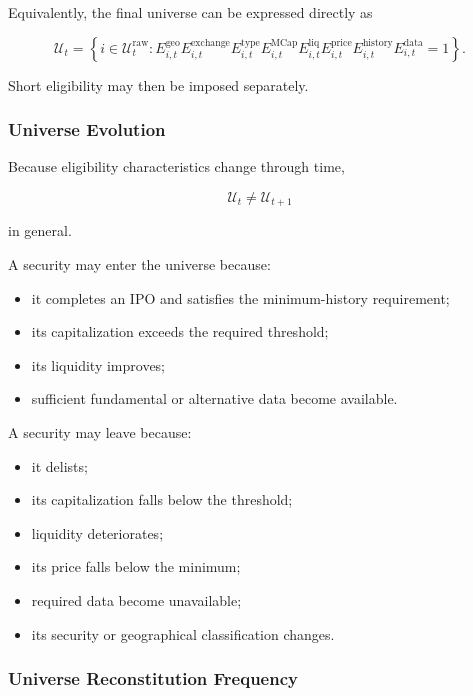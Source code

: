 \documentclass[11pt,a4paper]{article}
\begin{document}
Equivalently, the final universe can be expressed directly as

\begin{equation}
\boxed{
\mathcal{U}_t
=
\left\{
i\in\mathcal{U}_t^{\mathrm{raw}}
:
E_{i,t}^{\mathrm{geo}}
E_{i,t}^{\mathrm{exchange}}
E_{i,t}^{\mathrm{type}}
E_{i,t}^{\mathrm{MCap}}
E_{i,t}^{\mathrm{liq}}
E_{i,t}^{\mathrm{price}}
E_{i,t}^{\mathrm{history}}
E_{i,t}^{\mathrm{data}}
=1
\right\}.
}
\end{equation}

Short eligibility may then be imposed separately.


\subsubsection{Universe Evolution}

Because eligibility characteristics change through time,

\begin{equation}
\boxed{
\mathcal{U}_t
\neq
\mathcal{U}_{t+1}
}
\end{equation}

in general.

A security may enter the universe because:

\begin{itemize}
    \item it completes an IPO and satisfies the minimum-history requirement;
    \item its capitalization exceeds the required threshold;
    \item its liquidity improves;
    \item sufficient fundamental or alternative data become available.
\end{itemize}

A security may leave because:

\begin{itemize}
    \item it delists;
    \item its capitalization falls below the threshold;
    \item liquidity deteriorates;
    \item its price falls below the minimum;
    \item required data become unavailable;
    \item its security or geographical classification changes.
\end{itemize}


\subsubsection{Universe Reconstitution Frequency}
\end{document}
